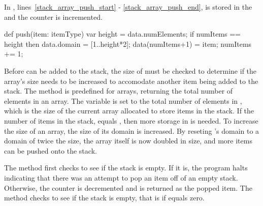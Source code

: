 In , lines~\ref{stack_array_push_start}
- \ref{stack_array_push_end},  is stored in the 
and the  counter is incremented.  
\begin{chapel}
  def push(item: itemType) {       
    var height = data.numElements;  
    if numItems == height then     
      data.domain = [1..height*2];
    data(numItems+1) = item;        
    numItems += 1;                 
  }                               
\end{chapel}
Before  can be added
to the stack, the size of  must be checked to determine if the array's size
needs to be increased to accomodate another item being added to the stack.
The method  is predefined for arrays, returning the total
number of elements in an array.  The variable  is set to the
total number of elements in , which is the size of the current array
allocated to store items in the stack.
If the number of items in the stack,  equals
, then more storage in  is needed.  To increase the
size of an array, the size of its domain is increased.
By reseting 's
domain to a domain of twice the size, the array  itself is now doubled in size,
and more items can be pushed onto the stack. 

The  method first checks to see if the stack is empty.  If it is, the program
halts indicating that there was an attempt to pop an item off of an empty stack.
Otherwise, the  counter is decremented and 
is returned as the popped item.  The  method checks to see if
the stack is empty, that is if  equals zero.

